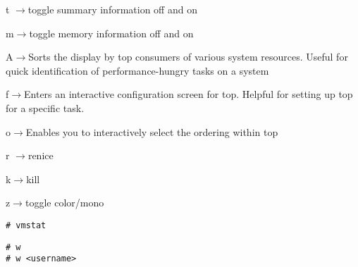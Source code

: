 \documentclass[9pt]{amsart}
\newcommand{\filldots}{\noindent \textbf {\textcolor {blue} {\dotfill}} }
\begin{document}
\begin{multicols}{2}
t $\to$toggle summary information off and on

m$\to$toggle memory information off and on

A$\to$Sorts the display by top consumers of various system resources. Useful for quick identification of performance-hungry tasks on a system

f$\to$Enters an interactive configuration screen for top. Helpful for setting up top for a specific task.

o$\to$Enables you to interactively select the ordering within top

r $\to$renice

k$\to$kill

z$\to$toggle color/mono

\noindent {\textcolor {blue} {\em System Activity, Hardware and System Information}} 

\begin{lstlisting}
# vmstat
\end{lstlisting}

\noindent {\textcolor {blue} {\em Find Out Who Is Logged on And What They Are Doing}} 

\begin{lstlisting}
# w
# w <username>
\end{lstlisting}

\filldots 


\end{multicols}
\end{document}

